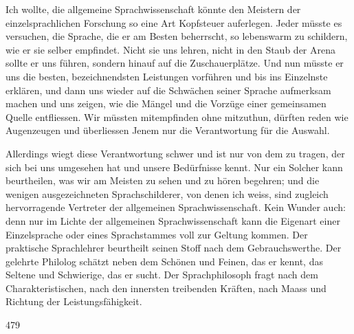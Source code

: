 Ich wollte, die allgemeine Sprachwissenschaft könnte den Meistern der einzelsprachlichen Forschung so eine Art Kopfsteuer auferlegen. Jeder müsste es versuchen, die Sprache, die er am Besten beherrscht, so \label{fp.459} lebenswarm zu schildern, wie er sie selber empfindet. Nicht sie uns lehren, nicht in den Staub der Arena sollte er uns führen, sondern hinauf auf die Zuschauerplätze. Und nun müsste er uns die besten, bezeichnendsten Leistungen vorführen und bis ins Einzelnste erklären, und dann uns wieder auf die Schwächen seiner Sprache aufmerksam machen und uns zeigen, wie die Mängel und die Vorzüge einer gemeinsamen Quelle entfliessen. Wir müssten mitempfinden ohne mitzuthun, dürften reden wie Augenzeugen und überliessen Jenem nur die Verantwortung für die Auswahl.

Allerdings wiegt diese Verantwortung schwer und ist nur von dem zu tragen, der sich bei uns umgesehen hat und unsere Bedürfnisse kennt. Nur ein Solcher kann beurtheilen, was wir am Meisten zu sehen und zu hören begehren; und die wenigen ausgezeichneten Sprachschilderer, von denen ich weiss, sind zugleich hervorragende Vertreter der allgemeinen Sprachwissenschaft. Kein Wunder auch: denn nur im Lichte der allgemeinen Sprachwissenschaft kann die Eigenart einer Einzelsprache oder eines Sprachstammes voll zur Geltung kommen. Der praktische Sprachlehrer beurtheilt seinen Stoff nach dem Gebrauchswerthe. Der gelehrte Philolog schätzt neben dem Schönen und Feinen, das er kennt, das Seltene und Schwierige, das er sucht. Der Sprachphilosoph fragt nach dem Charakteristischen, nach den innersten treibenden Kräften, nach Maass und Richtung der Leistungsfähigkeit.

 {\textbar}{\textbar}479{\textbar}{\textbar}\label{sp.479} 

